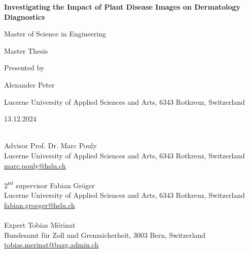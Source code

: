 \begin{center}

\vspace*{1cm}
\Huge{\textbf{Investigating the Impact of Plant Disease Images on Dermatology Diagnostics}}\par

\vspace*{1cm}
\large{Master of Science in Engineering}\par
\LARGE{Master Thesis}\par

\vspace*{1cm}
\large{Presented by}\par
\LARGE{Alexander Peter}\par

\vspace*{1cm}
\large{Lucerne University of Applied Sciences and Arts, 6343 Rotkreuz, Switzerland}\par

\vspace*{1cm}
\large{13.12.2024}\par

\end{center}

\vspace*{\fill}

\begin{tabbing}
\phantom{Co-Supervisor } \= \\ %
Advisor \> Prof. Dr. Marc Pouly \\
		\> Lucerne University of Applied Sciences and Arts, 6343 Rotkreuz, Switzerland \\
\> \href{mailto:marc.pouly@hslu.ch}{marc.pouly@hslu.ch} \\
\\
$2^{\text{nd}}$ supervisor \> Fabian Gröger \\
		\> Lucerne University of Applied Sciences and Arts, 6343 Rotkreuz, Switzerland \\
\> \href{mailto:fabian.groeger@hslu.ch}{fabian.groeger@hslu.ch} \\
\\
Expert \> Tobias Mérinat \\
\> Bundesamt für Zoll und Grenzsicherheit, 3003 Bern, Switzerland \\
\> \href{mailto:tobias.merinat@bazg.admin.ch}{tobias.merinat@bazg.admin.ch} \\
\end{tabbing}

\newpage
